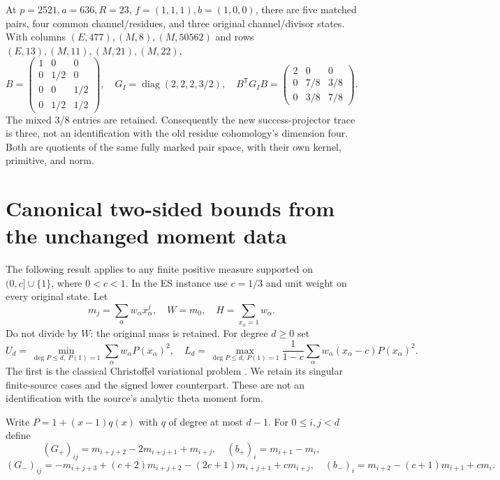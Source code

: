 At $p=2521,a=636,R=23$, $f=(1,1,1),b=(1,0,0)$, there are five matched
pairs, four common channel/residues, and three original channel/divisor
states. With columns $(E,477),(M,8),(M,50562)$ and rows
$(E,13),(M,11),(M,21),(M,22)$,
\[
 B=\begin{pmatrix}1&0&0\\0&1/2&0\\0&0&1/2\\0&1/2&1/2\end{pmatrix},
 \quad G_I=\operatorname{diag}(2,2,2,3/2),\quad
 B^{\mathsf T}G_IB=
 \begin{pmatrix}2&0&0\\0&7/8&3/8\\0&3/8&7/8\end{pmatrix}.
 \tag{W7}
\]
The mixed $3/8$ entries are retained. Consequently the new success-projector
trace is three, not an identification with the old residue cohomology's
dimension four. Both are quotients of the same fully marked pair space,
with their own kernel, primitive, and norm.

\section{Canonical two-sided bounds from the unchanged moment data}
The following result applies to any finite positive measure supported on
$(0,c]\cup\{1\}$, where $0<c<1$. In the ES instance use $c=1/3$ and unit
weight on every original state. Let
\[
 m_j=\sum_\alpha w_\alpha x_\alpha^j,\quad
 W=m_0,\quad H=\sum_{x_\alpha=1}w_\alpha.
\]
Do not divide by $W$: the original mass is retained. For degree $d\ge0$ set
\[
 U_d=\min_{\deg P\le d,\ P(1)=1}\sum_\alpha w_\alpha P(x_\alpha)^2,
\quad
 L_d=\max_{\deg P\le d,\ P(1)=1}
 \frac1{1-c}\sum_\alpha w_\alpha(x_\alpha-c)P(x_\alpha)^2.
 \tag{M1}
\]
The first is the classical Christoffel variational problem \cite[eqs.~(2.2)--(2.3)]{Las}.
We retain its singular finite-source cases and the signed lower counterpart.
These are not an identification with the source's analytic theta moment form.

Write $P=1+(x-1)q(x)$ with $q$ of degree at most $d-1$.
For $0\le i,j<d$ define
\[
 (G_+)_{ij}=m_{i+j+2}-2m_{i+j+1}+m_{i+j},\quad
 (b_+)_i=m_{i+1}-m_i,
\]
\[
 (G_-)_{ij}=-m_{i+j+3}+(c+2)m_{i+j+2}
 -(2c+1)m_{i+j+1}+cm_{i+j},
\quad
 (b_-)_i=m_{i+2}-(c+1)m_{i+1}+cm_i.
 \tag{M2}
\]

